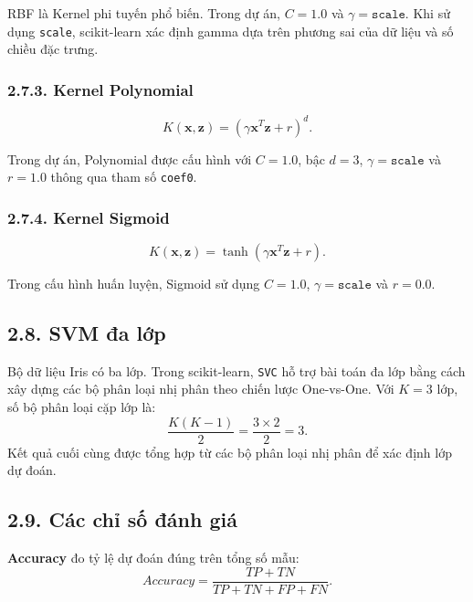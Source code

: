 \documentclass{article}
\begin{document}
	RBF là Kernel phi tuyến phổ biến. Trong dự án, $C=1.0$ và $\gamma=\texttt{scale}$. Khi sử dụng \texttt{scale}, scikit-learn xác định gamma dựa trên phương sai của dữ liệu và số chiều đặc trưng.
	
	\subsubsection{2.7.3. Kernel Polynomial}
	\begin{equation}
		K(\mathbf{x},\mathbf{z})=
		(\gamma\mathbf{x}^{T}\mathbf{z}+r)^d.
	\end{equation}
	
	Trong dự án, Polynomial được cấu hình với $C=1.0$, bậc $d=3$, $\gamma=\texttt{scale}$ và $r=1.0$ thông qua tham số \texttt{coef0}.
	
	\subsubsection{2.7.4. Kernel Sigmoid}
	\begin{equation}
		K(\mathbf{x},\mathbf{z})=
		\tanh(\gamma\mathbf{x}^{T}\mathbf{z}+r).
	\end{equation}
	
	Trong cấu hình huấn luyện, Sigmoid sử dụng $C=1.0$, $\gamma=\texttt{scale}$ và $r=0.0$.
	
	\subsection{2.8. SVM đa lớp}
	\hspace{0.5cm}
	Bộ dữ liệu Iris có ba lớp. Trong scikit-learn, \texttt{SVC} hỗ trợ bài toán đa lớp bằng cách xây dựng các bộ phân loại nhị phân theo chiến lược One-vs-One. Với $K=3$ lớp, số bộ phân loại cặp lớp là:
	\begin{equation}
		\frac{K(K-1)}{2}=\frac{3\times2}{2}=3.
	\end{equation}
	Kết quả cuối cùng được tổng hợp từ các bộ phân loại nhị phân để xác định lớp dự đoán.
	
	\subsection{2.9. Các chỉ số đánh giá}
	\hspace{0.5cm}
	\textbf{Accuracy} đo tỷ lệ dự đoán đúng trên tổng số mẫu:
	\begin{equation}
		Accuracy=\frac{TP+TN}{TP+TN+FP+FN}.
	\end{equation}
	
\end{document}
